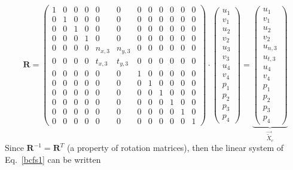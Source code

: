 \[
{\bm R}=
\left(\begin{array}{cccccccccccc}
1 & 0 & 0 & 0 & 0 & 0 & 0 & 0 &  0 & 0 & 0 & 0 \\
0 & 1 & 0 & 0 & 0 & 0 & 0 & 0 &  0 & 0 & 0 & 0 \\
0 & 0 & 1 & 0 & 0 & 0 & 0 & 0 &  0 & 0 & 0 & 0 \\
0 & 0 & 0 & 1 & 0 & 0 & 0 & 0 &  0 & 0 & 0 & 0 \\
0 & 0 & 0 & 0 & n_{x,3} & n_{y,3} & 0 & 0 &  0 & 0 & 0 & 0 \\
0 & 0 & 0 & 0 & t_{x,3} & t_{y,3} & 0 & 0 &  0 & 0 & 0 & 0 \\
0 & 0 & 0 & 0 & 0 & 0 & 1 & 0 &  0 & 0 & 0 & 0 \\
0 & 0 & 0 & 0 & 0 & 0 & 0 & 1 &  0 & 0 & 0 & 0 \\
0 & 0 & 0 & 0 & 0 & 0 & 0 & 0 & 1 & 0 & 0 & 0 \\
0 & 0 & 0 & 0 & 0 & 0 & 0 & 0 & 0 & 1 & 0 & 0 \\
0 & 0 & 0 & 0 & 0 & 0 & 0 & 0 & 0 & 0 & 1 & 0 \\
0 & 0 & 0 & 0 & 0 & 0 & 0 & 0 & 0 & 0 & 0 & 1 
\end{array} \right)
\cdot
\begin{pmatrix}
u_1 \\ v_1 \\ 
u_2 \\ v_2 \\ 
u_3 \\ v_3 \\ 
u_4 \\ v_4 \\
p_1 \\ p_2 \\ p_3 \\ p_4
\end{pmatrix}
=
\underbrace{
\begin{pmatrix}
u_1 \\ v_1 \\ 
u_2 \\ v_2 \\ 
u_{n,3} \\ u_{t,3} \\ 
u_4 \\ v_4 \\
p_1 \\ p_2 \\ p_3 \\ p_4
\end{pmatrix}
}_{\vec{\tilde X}_e}
\]
Since ${\bm R}^{-1} = {\bm R}^T$ (a property of rotation matrices), 
then the linear system of Eq.~\eqref{bcfs1} can be written 
